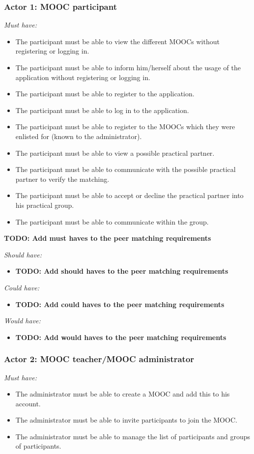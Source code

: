 \documentclass[]{article}
\newcommand{\TODO}[1]{{\color{red}\textbf{TODO: #1}}}
\begin{document}
\subsubsection{Actor 1: MOOC participant}
\emph{Must have:}
\begin{itemize}
\item The participant must be able to view the different MOOCs without registering or logging in.
\item The participant must be able to inform him/herself about the usage of the application without registering or logging in.
\item The participant must be able to register to the application.
\item The participant must be able to log in to the application.
\item The participant must be able to register to the MOOCs which they were enlisted for (known to the administrator).
\item The participant must be able to view a possible practical partner.
\item The participant must be able to communicate with the possible practical partner to verify the matching.
\item The participant must be able to accept or decline the practical partner into his practical group.
\item The participant must be able to communicate within the group.
\end{itemize}
\TODO{Add must haves to the peer matching requirements}

\emph{Should have:}
\begin{itemize}
\item \TODO{Add should haves to the peer matching requirements}
\end{itemize}

\emph{Could have:}
\begin{itemize}
\item \TODO{Add could haves to the peer matching requirements}
\end{itemize}

\emph{Would have:}
\begin{itemize}
\item \TODO{Add would haves to the peer matching requirements}
\end{itemize}

\subsubsection{Actor 2: MOOC teacher/MOOC administrator}
\emph{Must have:}
\begin{itemize}
\item The administrator must be able to create a MOOC and add this to his account.
\item The administrator must be able to invite participants to join the MOOC.
\item The administrator must be able to manage the list of participants and groups of participants.
\end{itemize}
\end{document}
